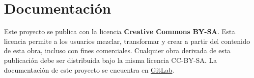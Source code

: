 \chapter{Documentación}\label{cap:documentación}
	
	Este proyecto se publica con la licencia \textbf{Creative Commons BY-SA}. Esta licencia permite a los usuarios mezclar, transformar y crear a partir del contenido de esta obra, incluso con fines comerciales. Cualquier obra derivada de esta publicación debe ser distribuida bajo la misma licencia CC-BY-SA. La documentación de este proyecto se encuentra en \href{https://gitlab.com/emablanco/trabajo-final-tusl}{\color{blue}GitLab}.\par